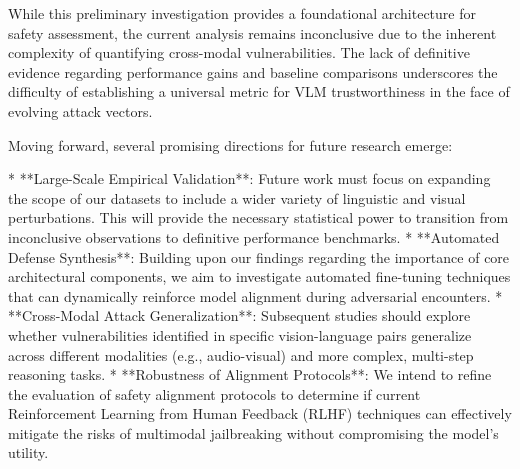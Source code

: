 \documentclass[11pt,a4paper]{article}
\begin{document}
While this preliminary investigation provides a foundational architecture for safety assessment, the current analysis remains inconclusive due to the inherent complexity of quantifying cross-modal vulnerabilities. The lack of definitive evidence regarding performance gains and baseline comparisons underscores the difficulty of establishing a universal metric for VLM trustworthiness in the face of evolving attack vectors.

Moving forward, several promising directions for future research emerge:

* **Large-Scale Empirical Validation**: Future work must focus on expanding the scope of our datasets to include a wider variety of linguistic and visual perturbations. This will provide the necessary statistical power to transition from inconclusive observations to definitive performance benchmarks.
* **Automated Defense Synthesis**: Building upon our findings regarding the importance of core architectural components, we aim to investigate automated fine-tuning techniques that can dynamically reinforce model alignment during adversarial encounters.
* **Cross-Modal Attack Generalization**: Subsequent studies should explore whether vulnerabilities identified in specific vision-language pairs generalize across different modalities (e.g., audio-visual) and more complex, multi-step reasoning tasks.
* **Robustness of Alignment Protocols**: We intend to refine the evaluation of safety alignment protocols to determine if current Reinforcement Learning from Human Feedback (RLHF) techniques can effectively mitigate the risks of multimodal jailbreaking without compromising the model's utility.
\end{document}
